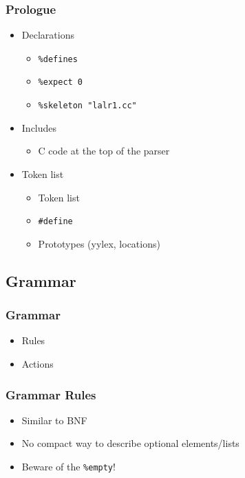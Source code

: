 \documentclass{beamer}
\begin{document}
\begin{frame}
  \frametitle{Prologue}
    \begin{itemize}
      \item Declarations
      \begin{itemize}
        \item \texttt{\%defines}
        \item \texttt{\%expect 0}
        \item \texttt{\%skeleton "lalr1.cc"}
      \end{itemize}
      \item Includes
      \begin{itemize}
        \item C code at the top of the parser
      \end{itemize}
      \item Token list
      \begin{itemize}
        \item Token list
        \item \texttt{\#define}
        \item Prototypes (yylex, locations)
      \end{itemize}
  \end{itemize}
\end{frame}

\subsection{Grammar}

\begin{frame}
  \frametitle{Grammar}
    \begin{itemize}
      \item Rules
      \item Actions
    \end{itemize}
\end{frame}

\begin{frame}
  \frametitle{Grammar Rules}
    \begin{itemize}
      \item Similar to BNF
      \item No compact way to describe optional elements/lists
      \item Beware of the \texttt{\%empty}!
    \end{itemize}
\end{frame}
\end{document}
